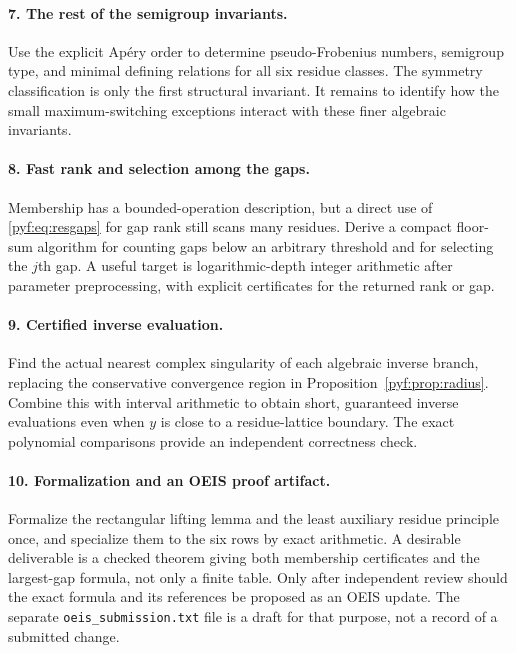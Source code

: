 \documentclass[11pt,a4paper]{article}
\numberwithin{equation}{section}
\theoremstyle{definition}
\begin{document}
\paragraph{7. The rest of the semigroup invariants.}
Use the explicit Ap\'ery order to determine pseudo-Frobenius numbers,
semigroup type, and minimal defining relations for all six residue
classes. The symmetry classification is only the first structural
invariant. It remains to identify how the small maximum-switching
exceptions interact with these finer algebraic invariants.

\paragraph{8. Fast rank and selection among the gaps.}
Membership has a bounded-operation description, but a direct use of
\eqref{pyf:eq:resgaps} for gap rank still scans many residues. Derive a compact
floor-sum algorithm for counting gaps below an arbitrary threshold and
for selecting the $j$th gap. A useful target is logarithmic-depth integer
arithmetic after parameter preprocessing, with explicit certificates for
the returned rank or gap.

\paragraph{9. Certified inverse evaluation.}
Find the actual nearest complex singularity of each algebraic inverse
branch, replacing the conservative convergence region in
Proposition~\ref{pyf:prop:radius}. Combine this with interval arithmetic to
obtain short, guaranteed inverse evaluations even when $y$ is close to a
residue-lattice boundary. The exact polynomial comparisons provide an
independent correctness check.

\paragraph{10. Formalization and an OEIS proof artifact.}
Formalize the rectangular lifting lemma and the least auxiliary residue
principle once, and specialize them to the six rows by exact arithmetic.
A desirable deliverable is a checked theorem giving both membership
certificates and the largest-gap formula, not only a finite table.
Only after independent review should the exact formula and its references
be proposed as an OEIS update. The separate
\texttt{oeis\_submission.txt} file is a draft for that purpose, not a
record of a submitted change.
\end{document}
